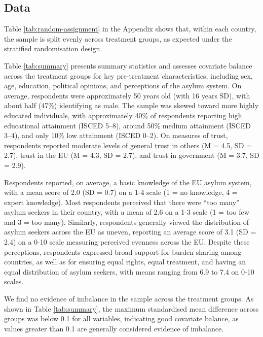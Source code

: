 \documentclass[
  12pt,
  a4paper,
]{article}
\begin{document}
\subsection{Data}\label{data}

Table \ref{tab:random-assignment} in the Appendix shows that, within each country, the sample is split evenly across treatment groups, as expected under the stratified randomisation design.

Table \ref{tab:summary} presents summary statistics and assesses covariate balance across the treatment groups for key pre-treatment characteristics, including sex, age, education, political opinions, and perceptions of the asylum system. On average, respondents were approximately 50 years old (with 16 years SD), with about half (47\%) identifying as male. The sample was skewed toward more highly educated individuals, with approximately 40\% of respondents reporting high educational attainment (ISCED 5--8), around 50\% medium attainment (ISCED 3--4), and only 10\% low attainment (ISCED 0--2). On measures of trust, respondents reported moderate levels of general trust in others (M = 4.5, SD = 2.7), trust in the EU (M = 4.3, SD = 2.7), and trust in government (M = 3.7, SD = 2.9).

Respondents reported, on average, a basic knowledge of the EU asylum system, with a mean score of 2.0 (SD = 0.7) on a 1-4 scale (1 = no knowledge, 4 = expert knowledge). Most respondents perceived that there were ``too many'' asylum seekers in their country, with a mean of 2.6 on a 1-3 scale (1 = too few and 3 = too many). Similarly, respondents generally viewed the distribution of asylum seekers across the EU as uneven, reporting an average score of 3.1 (SD = 2.4) on a 0-10 scale measuring perceived evenness across the EU. Despite these perceptions, respondents expressed broad support for burden sharing among countries, as well as for ensuring equal rights, equal treatment, and having an equal distribution of asylum seekers, with means ranging from 6.9 to 7.4 on 0-10 scales.

We find no evidence of imbalance in the sample across the treatment groups. As shown in Table \ref{tab:summary}, the maximum standardised mean difference across groups was below 0.1 for all variables, indicating good covariate balance, as values greater than 0.1 are generally considered evidence of imbalance.
\end{document}
